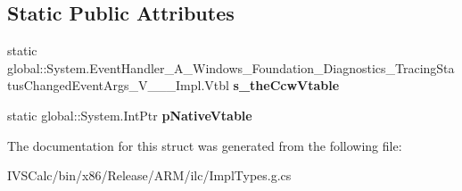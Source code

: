 \subsection*{Static Public Attributes}
\begin{DoxyCompactItemize}
\item 
\mbox{\label{struct_system_1_1_event_handler___a___windows___foundation___diagnostics___tracing_status_changedfe64b3ab054bcd8e33973c4cffad16b_a1d026ff8fbdd772e5b2fee521c1c27aa}} 
static global\+::\+System.\+Event\+Handler\+\_\+\+A\+\_\+\+Windows\+\_\+\+Foundation\+\_\+\+Diagnostics\+\_\+\+Tracing\+Status\+Changed\+Event\+Args\+\_\+\+V\+\_\+\+\_\+\+\_\+\+Impl.\+Vtbl {\bfseries s\+\_\+the\+Ccw\+Vtable}
\item 
\mbox{\label{struct_system_1_1_event_handler___a___windows___foundation___diagnostics___tracing_status_changedfe64b3ab054bcd8e33973c4cffad16b_a459438bd2ed726e9705cd22c40c40669}} 
static global\+::\+System.\+Int\+Ptr {\bfseries p\+Native\+Vtable}
\end{DoxyCompactItemize}


The documentation for this struct was generated from the following file\+:\begin{DoxyCompactItemize}
\item 
I\+V\+S\+Calc/bin/x86/\+Release/\+A\+R\+M/ilc/Impl\+Types.\+g.\+cs\end{DoxyCompactItemize}

